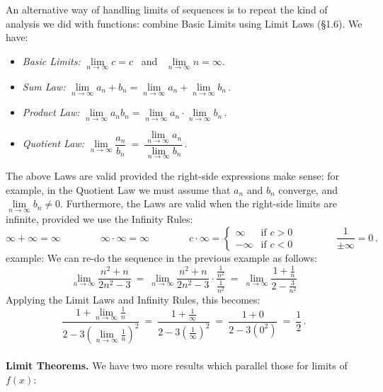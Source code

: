 \documentclass[11pt]{article}
\begin{document}
An alternative way of handling limits of sequences is to repeat the kind of analysis we did with functions: combine Basic Limits using Limit Laws (\S1.6).
We have:

\begin{itemize}

\item {\it Basic Limits:} $\lim\limits_{n\to\infty} c = c$ \ and \ $\lim\limits_{n\to\infty} n = \infty$.


\item {\it Sum Law:} $\lim\limits_{n\to\infty}a_n+b_n=\lim\limits_{n\to\infty}a_n+\lim\limits_{n\to\infty}b_n$\,.

\item {\it Product Law:} $\lim\limits_{n\to\infty}a_nb_n=\lim\limits_{n\to\infty}a_n\cdot\lim\limits_{n\to\infty}b_n$\,.

\item {\it Quotient Law:} $\lim\limits_{n\to\infty}\dfrac{a_n}{b_n}\ =\ \dfrac{\lim\limits_{n\to\infty}a_n}{\lim\limits_{n\to\infty}b_n}$\,.

\end{itemize}

\noindent
The above Laws are valid provided the right-side expressions make sense: for example, in the Quotient Law 
we must assume that $a_n$ and $b_n$ converge, and $\lim\limits_{n\to\infty}b_n\neq 0$.  Furthermore, the Laws 
are valid when the right-side limits are infinite, provided we use the Infinity Rules:
\\[-1em]
$$
\infty + \infty =\infty \qquad\qquad \infty\cdot\infty =\infty \qquad\qquad 
c\cdot\infty = \left\{\begin{array}{rl}\infty&\text{if $c>0$}\\ -\infty & \text{if $c<0$}\end{array}\right.
\qquad\qquad
\frac{1}{\pm\infty} = 0\,.
$$
{\sc example:} We can re-do the sequence in the previous example as follows:
$$
\lim_{n\to\infty}\frac{n^2+n}{2n^2-3}
\ =\
\lim_{n\to\infty}\frac{n^2+n}{2n^2-3}\cdot \frac{\frac1{n^2}}{\frac1{n^2}}
\ =\
\lim_{n\to\infty}\frac{1+\frac1n}{2-\frac3{n^2}}
$$
Applying the Limit Laws and Infinity Rules, this becomes:
$$
\frac{1+\lim\limits_{n\to\infty}\frac1n}{2-3\!\left(\lim\limits_{n\to\infty}\frac1n\right)^{\!2}}
\ =\
\frac{1+\frac1{\infty}}{2-3\!\left(\frac1{\infty}\right)^{\!2}}
\ =\
\frac{1+0}{2-3(0^2)}
\ =\ \frac12\,.
$$
\\[0em]
{\bf Limit Theorems.} We have two more results which parallel those for limits of $f(x)$:
\end{document}
